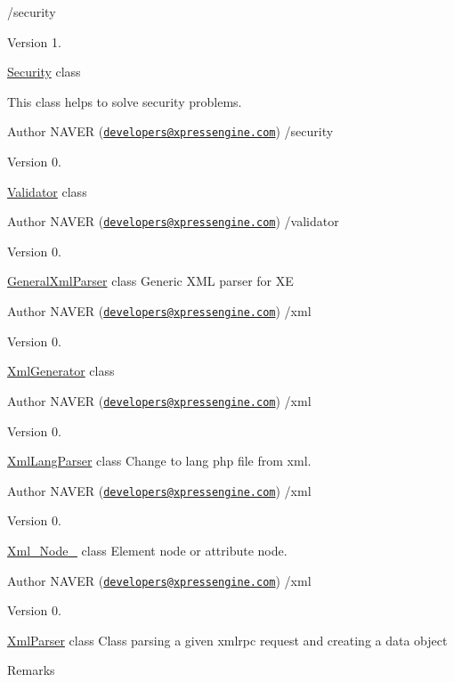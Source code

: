 /security \begin{DoxyVersion}{Version}
1.
\end{DoxyVersion}

\begin{DoxyItemize}
\item \hyperlink{classSecurity}{Security} class
\item This class helps to solve security problems. \begin{DoxyAuthor}{Author}
N\-A\-V\-E\-R (\href{mailto:developers@xpressengine.com}{\tt developers@xpressengine.\-com}) /security 
\end{DoxyAuthor}
\begin{DoxyVersion}{Version}
0.
\end{DoxyVersion}
\hyperlink{classValidator}{Validator} class \begin{DoxyAuthor}{Author}
N\-A\-V\-E\-R (\href{mailto:developers@xpressengine.com}{\tt developers@xpressengine.\-com}) /validator 
\end{DoxyAuthor}
\begin{DoxyVersion}{Version}
0.
\end{DoxyVersion}
\hyperlink{classGeneralXmlParser}{General\-Xml\-Parser} class Generic X\-M\-L parser for X\-E \begin{DoxyAuthor}{Author}
N\-A\-V\-E\-R (\href{mailto:developers@xpressengine.com}{\tt developers@xpressengine.\-com}) /xml 
\end{DoxyAuthor}
\begin{DoxyVersion}{Version}
0.
\end{DoxyVersion}
\hyperlink{classXmlGenerator}{Xml\-Generator} class \begin{DoxyAuthor}{Author}
N\-A\-V\-E\-R (\href{mailto:developers@xpressengine.com}{\tt developers@xpressengine.\-com}) /xml 
\end{DoxyAuthor}
\begin{DoxyVersion}{Version}
0.
\end{DoxyVersion}
\hyperlink{classXmlLangParser}{Xml\-Lang\-Parser} class Change to lang php file from xml. \begin{DoxyAuthor}{Author}
N\-A\-V\-E\-R (\href{mailto:developers@xpressengine.com}{\tt developers@xpressengine.\-com}) /xml 
\end{DoxyAuthor}
\begin{DoxyVersion}{Version}
0.
\end{DoxyVersion}
\hyperlink{classXml__Node__}{Xml\-\_\-\-Node\-\_\-} class Element node or attribute node. \begin{DoxyAuthor}{Author}
N\-A\-V\-E\-R (\href{mailto:developers@xpressengine.com}{\tt developers@xpressengine.\-com}) /xml 
\end{DoxyAuthor}
\begin{DoxyVersion}{Version}
0.
\end{DoxyVersion}
\hyperlink{classXmlParser}{Xml\-Parser} class Class parsing a given xmlrpc request and creating a data object \begin{DoxyRemark}{Remarks}


\end{DoxyRemark}
\end{DoxyItemize}
